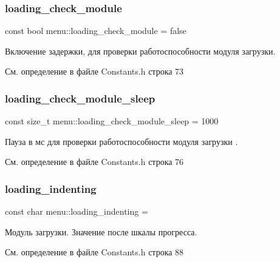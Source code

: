 \mbox{\label{namespacemenu_aaea5c70964114a416caa58676ddf8066}} 
\subsubsection{\texorpdfstring{loading\+\_\+check\+\_\+module}{loading\_check\_module}}
{\footnotesize\ttfamily const bool menu\+::loading\+\_\+check\+\_\+module = false}

Включение задержки, для проверки работоспособности модуля загрузки. 

См. определение в файле Constants.\+h строка 73

\mbox{\label{namespacemenu_a69bce854c4a150920a5c77eede8cab0a}} 
\subsubsection{\texorpdfstring{loading\+\_\+check\+\_\+module\+\_\+sleep}{loading\_check\_module\_sleep}}
{\footnotesize\ttfamily const size\+\_\+t menu\+::loading\+\_\+check\+\_\+module\+\_\+sleep = 1000}

Пауза в мс для проверки работоспособности модуля загрузки . 

См. определение в файле Constants.\+h строка 76

\mbox{\label{namespacemenu_ad004c327a8a1c14388a6c7f23d6953a6}} 
\subsubsection{\texorpdfstring{loading\+\_\+indenting}{loading\_indenting}}
{\footnotesize\ttfamily const char menu\+::loading\+\_\+indenting = \textquotesingle{} \textquotesingle{}}

Модуль загрузки. Значение после шкалы прогресса. 

См. определение в файле Constants.\+h строка 88

